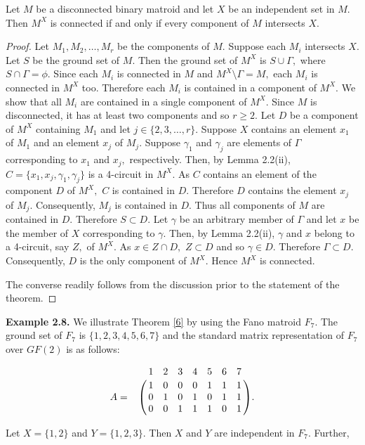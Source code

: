 \documentclass[
11pt,%
tightenlines,%
twoside,%
onecolumn,%
nofloats,%
nobibnotes,%
nofootinbib,%
superscriptaddress,%
noshowpacs,%
centertags]%
{revtex4}
\begin{document}
\begin{theorem}
Let $M$ be a disconnected binary matroid  and let $X$ be an
independent set in $M.$  Then $M^X$ is connected if and only if
every component of $M$ intersects $X.$
\end{theorem}
\begin{proof} Let $M_1, M_2,\dots, M_r$ be the
components of $M.$  Suppose each $M_i$ intersects $X$.
Let $S$ be the ground set of $M.$ Then the ground set of $M^X$ is
$S\cup \Gamma,$ where $S\cap \Gamma = \phi.$ Since  each  $M_i$ is connected
in $M$ and  $ M^X\setminus \Gamma = M,$ each $M_i$ is connected in $M^X$  too.
 Therefore each $M_i$ is contained in a component of $M^X.$  We show that all $M_i$ are
 contained in a single component of $M^X.$  Since $M$ is disconnected, it has at least two
 components and so $r\geq 2.$ Let $D$ be a component of $M^X$ containing $M_1$ and let $ j\in  \{2, 3, \dots, r\}.$
  Suppose $X$ contains an element $ x_1$ of $M_1$ and an element $ x_j$ of $M_j.$
  Suppose $\gamma_1$ and $ \gamma_j$ are elements  of $\Gamma$ corresponding to $x_1$ and $x_j,$ respectively.
  Then, by Lemma 2.2(ii), $ C = \{x_1, x_j, \gamma_1, \gamma_j\}$ is  a 4-circuit in $M^X.$ As $C$ contains
   an element of the component $D$ of $M^X,$ $C$ is contained in $D.$ Therefore $D$ contains the element $x_j$ of $M_j.$
   Consequently, $M_j$ is contained in $D.$ Thus all components of $M$ are contained in $D.$
   Therefore $S\subset D.$  Let $\gamma$ be an arbitrary member of $\Gamma$ and let $x $ be the
    member of $X$ corresponding to $\gamma.$ Then, by Lemma 2.2(ii), $\gamma$ and $x$ belong to a
    4-circuit, say $Z,$ of $M^X.$ As $x \in Z \cap D,$ $ Z \subset D$ and so $ \gamma \in D.$
    Therefore $ \Gamma \subset D.$  Consequently, $D$ is the only component of $M^X.$ Hence $M^X$ is connected.

The converse readily follows from the discussion prior to the statement of the theorem.
\end{proof}

{\bf Example 2.8.}
 We illustrate Theorem \ref{6} by using the Fano matroid $F_7.$
 The ground set of  $F_7$ is $\{1, 2, 3, 4, 5, 6, 7\}$ and the standard matrix representation
 of $F_7$ over $GF(2)$ is as follows:

$$
A = \bordermatrix{ ~&1 &2&3&4&5&6&7\cr
                  ~&1& 0&0&0&1&1&1 \cr
                  ~&0&1& 0&1&0&1&1\cr
                  ~&0&0&1&1&1&0&1
                  }.
$$

  Let $X  = \{1, 2\}$ and $ Y = \{1, 2, 3 \}.$ Then  $X$ and $Y$ are independent in $F_7.$ Further,
\end{document}
